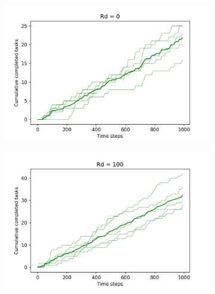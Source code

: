 \documentclass[11pt]{article}
\begin{document}
\begin{figure}[ht]
    \begin{subfigure}{.5\textwidth}
      \centering
      \includegraphics[width=\linewidth]{figures/Rd_0.png}
    \end{subfigure}
    \begin{subfigure}{.5\textwidth}
      \centering
      \includegraphics[width=\linewidth]{figures/Rd_100.png}
    \end{subfigure}
\end{figure}
\end{document}
